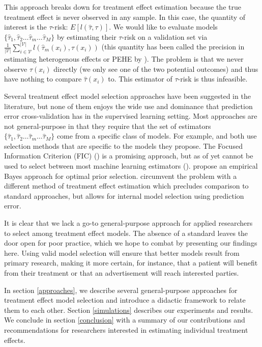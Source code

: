 This approach breaks down for treatment effect estimation because the true treatment effect is never observed in any sample. In this case, the quantity of interest is the $\tau$-risk: $E[l(\hat\tau, \tau)]$. We would like to evaluate models $\{\hat\tau_1, \hat\tau_2 \dots \hat \tau_m \dots \hat \tau_M\}$ by estimating their $\tau$-risk on a validation set via $\frac{1}{|\mathcal{V}|}\sum_{i \in \mathcal{V}}^{|\mathcal{V}|}  l(\hat \tau_m (x_i), \tau(x_i))$ (this quantity has been called the precision in estimating heterogenous effects or PEHE by \citet{Hill2011}). The problem is that we never observe $\tau(x_i)$ directly (we only see one of the two potential outcomes) and thus have nothing to compare $\hat\tau(x_i)$ to. This estimator of $\tau$-risk is thus infeasible.

Several treatment effect model selection approaches have been suggested in the literature, but none of them enjoys the wide use and dominance that prediction error cross-validation has in the supervised learning setting. Most approaches are not general-purpose in that they require that the set of estimators $\{\hat\tau_1, \hat\tau_2 \dots \hat \tau_m \dots \hat \tau_M\}$ come from a specific class of models. For example, \citet{Powers:2017wd} and \citet{Athey2015} both use selection methods that are specific to the models they propose. The Focused Information Criterion (FIC) (\citealp{Claeskens:2003ck}) is a promising approach, but as of yet cannot be used to select between most machine learning estimators (\citealp{Jullum:2012uo}). \citet{Alaa:tj} propose an empirical Bayes approach for optimal prior selection. \citet{Nie:2017vi} circumvent the problem with a different method of treatment effect estimation which precludes comparison to standard approaches, but allows for internal model selection using prediction error. 

It is clear that we lack a go-to general-purpose approach for applied researchers to select among treatment effect models. The absence of a standard leaves the door open for poor practice, which we hope to combat by presenting our findings here. Using valid model selection will ensure that better models result from primary research, making it more certain, for instance, that a patient will benefit from their treatment or that an advertisement will reach interested parties. 

In section \ref{approaches}, we describe several general-purpose approaches for treatment effect model selection and introduce a didactic framework to relate them to each other. Section \ref{simulations} describes our experiments and results. We conclude in section \ref{conclusion} with a summary of our contributions and recommendations for researchers interested in estimating individual treatment effects.
